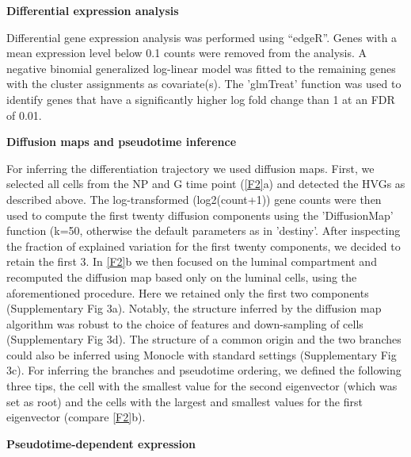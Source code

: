 \documentclass[titlepage, 12pt, oneside]{amsart}
\begin{document}
\textbf{Differential expression analysis }

Differential gene expression analysis was performed using ``edgeR''\autocite{Robinson2010}.
Genes with a mean expression level below 0.1 counts were removed from the analysis.
A negative binomial generalized log-linear model was fitted to the remaining genes with the cluster assignments as covariate(s).
The 'glmTreat' function was used to identify genes that have a significantly higher log fold change than 1 at an FDR of 0.01.

\textbf{Diffusion maps and pseudotime inference}

For inferring the differentiation trajectory we used diffusion maps.
First, we selected all cells from the NP and G time point (\autoref{F2}a) and detected the HVGs as described above.
The log-transformed (log2(count+1)) gene counts were then used to compute the first twenty diffusion components using the 'DiffusionMap' function (k=50, otherwise the default parameters as in 'destiny'\autocite{Angerer2016}.
After inspecting the fraction of explained variation for the first twenty components, we decided to retain the first 3.
In \autoref{F2}b we then focused on the luminal compartment and recomputed the diffusion map based only on the luminal cells, using the aforementioned procedure.
Here we retained only the first two components (Supplementary Fig 3a).
Notably, the structure inferred by the diffusion map algorithm was robust to the choice of features and down-sampling of cells (Supplementary Fig 3d).
The structure of a common origin and the two branches could also be inferred using Monocle with standard settings\autocite{Trapnell2014} (Supplementary Fig 3c).
For inferring the branches and pseudotime ordering, we defined the following three tips, the cell with the smallest value for the second eigenvector (which was set as root) and the cells with the largest and smallest values for the first eigenvector (compare \autoref{F2}b).  

\textbf{Pseudotime-dependent expression}
\end{document}
